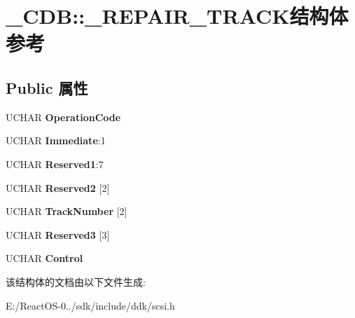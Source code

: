 \hypertarget{struct___c_d_b_1_1___r_e_p_a_i_r___t_r_a_c_k}{}\section{\+\_\+\+C\+DB\+:\+:\+\_\+\+R\+E\+P\+A\+I\+R\+\_\+\+T\+R\+A\+C\+K结构体 参考}
\label{struct___c_d_b_1_1___r_e_p_a_i_r___t_r_a_c_k}
\subsection*{Public 属性}
\begin{DoxyCompactItemize}
\item 
\mbox{\label{struct___c_d_b_1_1___r_e_p_a_i_r___t_r_a_c_k_abde6fa9d6d6d67ab42587267cc4fc6e4}} 
U\+C\+H\+AR {\bfseries Operation\+Code}
\item 
\mbox{\label{struct___c_d_b_1_1___r_e_p_a_i_r___t_r_a_c_k_ab1e347101004593ed463dc0871500273}} 
U\+C\+H\+AR {\bfseries Immediate}\+:1
\item 
\mbox{\label{struct___c_d_b_1_1___r_e_p_a_i_r___t_r_a_c_k_ad72cce45ae93a6d2f3e67730c1069055}} 
U\+C\+H\+AR {\bfseries Reserved1}\+:7
\item 
\mbox{\label{struct___c_d_b_1_1___r_e_p_a_i_r___t_r_a_c_k_a8bacc0aa706ffff2738cb651a6a3195e}} 
U\+C\+H\+AR {\bfseries Reserved2} \mbox{[}2\mbox{]}
\item 
\mbox{\label{struct___c_d_b_1_1___r_e_p_a_i_r___t_r_a_c_k_abc8e11f31c88cbe951f7ccdfa13ab667}} 
U\+C\+H\+AR {\bfseries Track\+Number} \mbox{[}2\mbox{]}
\item 
\mbox{\label{struct___c_d_b_1_1___r_e_p_a_i_r___t_r_a_c_k_ae5d80692718fa80c8b6a3ddafbb1e517}} 
U\+C\+H\+AR {\bfseries Reserved3} \mbox{[}3\mbox{]}
\item 
\mbox{\label{struct___c_d_b_1_1___r_e_p_a_i_r___t_r_a_c_k_a5493056676d58565ae5867545b8ef828}} 
U\+C\+H\+AR {\bfseries Control}
\end{DoxyCompactItemize}


该结构体的文档由以下文件生成\+:\begin{DoxyCompactItemize}
\item 
E\+:/\+React\+O\+S-\/0../sdk/include/ddk/scsi.\+h\end{DoxyCompactItemize}
